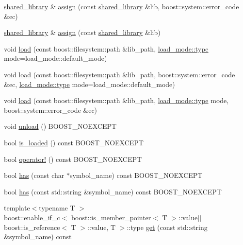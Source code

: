 \begin{DoxyCompactItemize}
\item 
\hyperlink{a00271}{shared\+\_\+library} \& \hyperlink{a00271_a2a721aaeab6fcb572362d002b3aceb7c}{assign} (const \hyperlink{a00271}{shared\+\_\+library} \&lib, boost\+::system\+::error\+\_\+code \&ec)
\item 
\hyperlink{a00271}{shared\+\_\+library} \& \hyperlink{a00271_abd3dd2379776454171c9846217abdec9}{assign} (const \hyperlink{a00271}{shared\+\_\+library} \&lib)
\item 
void \hyperlink{a00271_ae7df87e5b40963d6348a5962d9561f2e}{load} (const boost\+::filesystem\+::path \&lib\+\_\+path, \hyperlink{a00729_a1918a602801479bc0bade54ff5665129}{load\+\_\+mode\+::type} mode=load\+\_\+mode\+::default\+\_\+mode)
\item 
void \hyperlink{a00271_a6e8559f05d82d6e7f47beddd416cb734}{load} (const boost\+::filesystem\+::path \&lib\+\_\+path, boost\+::system\+::error\+\_\+code \&ec, \hyperlink{a00729_a1918a602801479bc0bade54ff5665129}{load\+\_\+mode\+::type} mode=load\+\_\+mode\+::default\+\_\+mode)
\item 
void \hyperlink{a00271_a7553f2922553fcf6e5e0564b0bbb93b8}{load} (const boost\+::filesystem\+::path \&lib\+\_\+path, \hyperlink{a00729_a1918a602801479bc0bade54ff5665129}{load\+\_\+mode\+::type} mode, boost\+::system\+::error\+\_\+code \&ec)
\item 
void \hyperlink{a00271_a0c01ab046e5dcabe4c10db2a28cbe33e}{unload} () B\+O\+O\+S\+T\+\_\+\+N\+O\+E\+X\+C\+E\+PT
\item 
bool \hyperlink{a00271_a31ec32c213665bd151f2c615f89f94ef}{is\+\_\+loaded} () const B\+O\+O\+S\+T\+\_\+\+N\+O\+E\+X\+C\+E\+PT
\item 
bool \hyperlink{a00271_ab790a042574a0df32b4fb424402e2d50}{operator!} () const B\+O\+O\+S\+T\+\_\+\+N\+O\+E\+X\+C\+E\+PT
\item 
bool \hyperlink{a00271_a450d2d74c10dfa790091880d0a95bc1d}{has} (const char $\ast$symbol\+\_\+name) const B\+O\+O\+S\+T\+\_\+\+N\+O\+E\+X\+C\+E\+PT
\item 
bool \hyperlink{a00271_a7f33a8cd84bf689a73ddeed81013bd79}{has} (const std\+::string \&symbol\+\_\+name) const B\+O\+O\+S\+T\+\_\+\+N\+O\+E\+X\+C\+E\+PT
\item 
{\footnotesize template$<$typename T $>$ }\\boost\+::enable\+\_\+if\+\_\+c$<$ boost\+::is\+\_\+member\+\_\+pointer$<$ T $>$\+::value$\vert$$\vert$boost\+::is\+\_\+reference$<$ T $>$\+::value, T $>$\+::type \hyperlink{a00271_afdbfd857893e7edde7c0e6b32c7144b3}{get} (const std\+::string \&symbol\+\_\+name) const 
$$
\end{DoxyCompactItemize}

